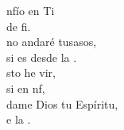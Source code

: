 \begin{cancion}%
	nfío en Ti\\
	de  fi.\\
	no andaré tusasos,\\
	si es desde la .\\
	sto he  vir,\\
	si en nf, \\
dame Dios tu Espíritu,\\
	e  la . \\
\end{cancion}%
